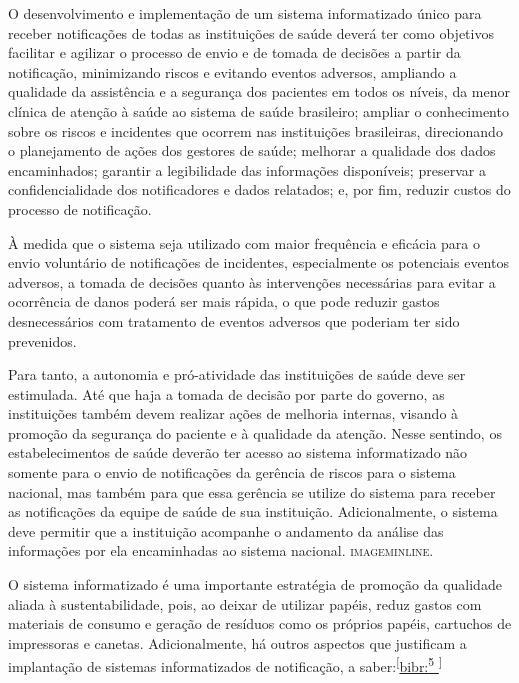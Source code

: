 \documentclass{article}
\begin{document}
O desenvolvimento e implementação de um sistema informatizado único para receber
notificações de todas as instituições de saúde deverá ter como objetivos
facilitar e
agilizar o processo de envio e de tomada de decisões a partir da notificação,
minimizando
riscos e evitando eventos adversos, ampliando a qualidade da assistência e a
segurança dos
pacientes em todos os níveis, da menor clínica de atenção à saúde ao sistema de
saúde
brasileiro; ampliar o conhecimento sobre os riscos e incidentes que ocorrem nas
instituições
brasileiras, direcionando o planejamento de ações dos gestores de saúde;
melhorar a
qualidade dos dados encaminhados; garantir a legibilidade das informações
disponíveis;
preservar a confidencialidade dos notificadores e dados relatados; e, por fim,
reduzir
custos do processo de notificação.

À medida que o sistema seja utilizado com maior frequência e eficácia para o
envio
voluntário de notificações de incidentes, especialmente os potenciais eventos
adversos, a
tomada de decisões quanto às intervenções necessárias para evitar a ocorrência
de danos
poderá ser mais rápida, o que pode reduzir gastos desnecessários com tratamento
de eventos
adversos que poderiam ter sido prevenidos.

Para tanto, a autonomia e pró-atividade das instituições de saúde deve ser
estimulada. Até
que haja a tomada de decisão por parte do governo, as instituições também devem
realizar
ações de melhoria internas, visando à promoção da segurança do paciente e à
qualidade da
atenção. Nesse sentindo, os estabelecimentos de saúde deverão ter acesso ao
sistema
informatizado não somente para o envio de notificações da gerência de riscos
para o sistema
nacional, mas também para que essa gerência se utilize do sistema para receber
as
notificações da equipe de saúde de sua instituição. Adicionalmente, o sistema
deve permitir
que a instituição acompanhe o andamento da análise das informações por ela
encaminhadas ao
sistema nacional. \textsc{imageminline}.

O sistema informatizado é uma importante estratégia de promoção da qualidade
aliada à
sustentabilidade, pois, ao deixar de utilizar papéis, reduz gastos com materiais
de consumo
e geração de resíduos como os próprios papéis, cartuchos de impressoras e
canetas.
Adicionalmente, há outros aspectos que justificam a implantação de sistemas
informatizados
de notificação, a saber:\textsuperscript{[}\hyperlink{\textsuperscript{5}
}{bibr:\textsuperscript{5}
}\textsuperscript{]}
\end{document}
